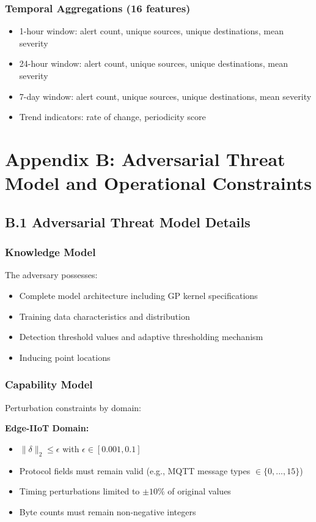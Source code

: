 \documentclass[12pt]{article}
\begin{document}
\subsubsection{Temporal Aggregations (16 features)}
\begin{itemize}
\item 1-hour window: alert count, unique sources, unique destinations, mean severity
\item 24-hour window: alert count, unique sources, unique destinations, mean severity
\item 7-day window: alert count, unique sources, unique destinations, mean severity
\item Trend indicators: rate of change, periodicity score
\end{itemize}

\section{Appendix B: Adversarial Threat Model and Operational Constraints}

\subsection{B.1 Adversarial Threat Model Details}

\subsubsection{Knowledge Model}
The adversary possesses:
\begin{itemize}
\item Complete model architecture including GP kernel specifications
\item Training data characteristics and distribution
\item Detection threshold values and adaptive thresholding mechanism
\item Inducing point locations
\end{itemize}

\subsubsection{Capability Model}
Perturbation constraints by domain:

\textbf{Edge-IIoT Domain:}
\begin{itemize}
\item $\|\delta\|_2 \leq \epsilon$ with $\epsilon \in [0.001, 0.1]$
\item Protocol fields must remain valid (e.g., MQTT message types $\in \{0,...,15\}$)
\item Timing perturbations limited to $\pm 10\%$ of original values
\item Byte counts must remain non-negative integers
\end{itemize}
\end{document}
